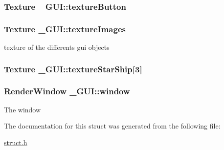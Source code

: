 \subsubsection[{\texorpdfstring{texture\+Button}{textureButton}}]{\setlength{\rightskip}{0pt plus 5cm}Texture \+\_\+\+G\+U\+I\+::texture\+Button}\hypertarget{struct___g_u_i_a9d68467300f6039050af8f2950cc8021}{}\label{struct___g_u_i_a9d68467300f6039050af8f2950cc8021}
\subsubsection[{\texorpdfstring{texture\+Images}{textureImages}}]{\setlength{\rightskip}{0pt plus 5cm}Texture \+\_\+\+G\+U\+I\+::texture\+Images}\hypertarget{struct___g_u_i_a57be58f1d814a11dc84161cc2a485d68}{}\label{struct___g_u_i_a57be58f1d814a11dc84161cc2a485d68}
texture of the differents gui objects 
\subsubsection[{\texorpdfstring{texture\+Star\+Ship}{textureStarShip}}]{\setlength{\rightskip}{0pt plus 5cm}Texture \+\_\+\+G\+U\+I\+::texture\+Star\+Ship\mbox{[}3\mbox{]}}\hypertarget{struct___g_u_i_a4cf2c74cbae665b04f9663c001994996}{}\label{struct___g_u_i_a4cf2c74cbae665b04f9663c001994996}
\subsubsection[{\texorpdfstring{window}{window}}]{\setlength{\rightskip}{0pt plus 5cm}Render\+Window \+\_\+\+G\+U\+I\+::window}\hypertarget{struct___g_u_i_a7466f3e309fdfed204b5b0131506f0fb}{}\label{struct___g_u_i_a7466f3e309fdfed204b5b0131506f0fb}
The window 

The documentation for this struct was generated from the following file\+:\begin{DoxyCompactItemize}
\item 
\hyperlink{struct_8h}{struct.\+h}\end{DoxyCompactItemize}
